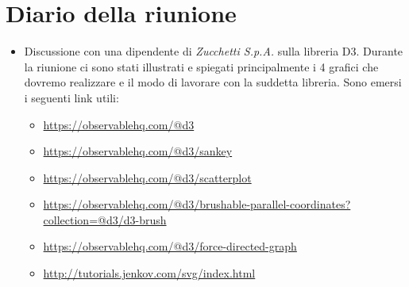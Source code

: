 \section{Diario della riunione}
\begin{itemize}
  \item Discussione con una dipendente di \textit{Zucchetti S.p.A.} sulla libreria D3. Durante la riunione ci sono stati illustrati e spiegati principalmente i 4 grafici che dovremo realizzare e il modo di lavorare con la suddetta libreria. Sono emersi i seguenti link utili:
  \begin{itemize}
    \item \url{https://observablehq.com/@d3}
    \item \url{https://observablehq.com/@d3/sankey}
    \item \url{https://observablehq.com/@d3/scatterplot}
    \item \url{https://observablehq.com/@d3/brushable-parallel-coordinates?collection=@d3/d3-brush}
    \item \url{https://observablehq.com/@d3/force-directed-graph}
    \item \url{http://tutorials.jenkov.com/svg/index.html}
  \end{itemize}
\end{itemize}
